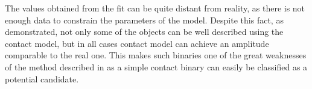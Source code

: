 \documentclass{pracalicmgr}
\begin{document}
The values obtained from the fit can be quite distant from reality, as there is not enough data to constrain the parameters of the model.
Despite this fact, as demonstrated, not only some of the objects can be well described using the contact model, but in all cases contact model can achieve an amplitude comparable to the real one. This makes such binaries one of the great weaknesses of the method described
in \citet{gomel_search_2021-2} as a simple contact binary can easily be classified as a potential candidate.
 
\end{document}
